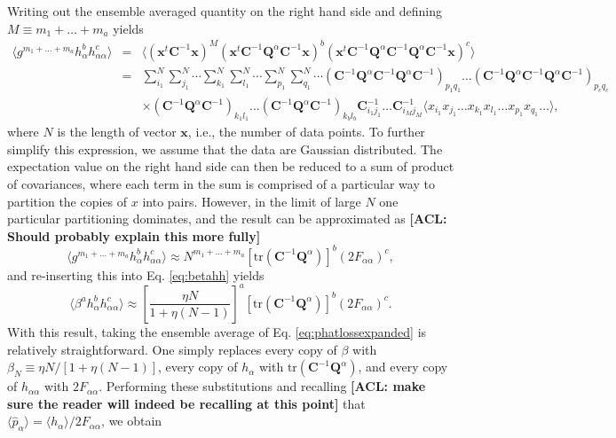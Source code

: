 \documentclass[preprint2,numberedappendix,tighten]{aastex6}  %
\newcommand{\x}{\mathbf{x}}
\newcommand{\C}{\mathbf{C}}
\newcommand{\Q}{\mathbf{Q}}
\newcommand{\acl}[1]{{\color{red} \textbf{[ACL:  #1]}}}
\begin{document}
Writing out the ensemble averaged quantity on the right hand side and defining $M \equiv m_1 + \dots + m_a$ yields
\begin{eqnarray}
\langle g^{m_1 + \dots + m_a} h_\alpha^b h_{\alpha \alpha}^c \rangle &=& \langle (\x^t \C^{-1} \x)^M (\x^t \C^{-1} \Q^\alpha \C^{-1} \x)^b (\x^t \C^{-1} \Q^\alpha \C^{-1} \Q^\alpha \C^{-1}\x )^c \rangle \nonumber \\
&=& \sum_{i_1}^N \sum_{j_1}^N \cdots  \sum_{k_1}^N \sum_{l_1}^N \cdots  \sum_{p_1}^N \sum_{q_1}^N \cdots  ( \C^{-1} \Q^\alpha \C^{-1} \Q^\alpha \C^{-1} )_{p_1 q_1} \dots (\C^{-1} \Q^\alpha \C^{-1} \Q^\alpha \C^{-1})_{p_c q_c}  \nonumber \\
&&  \times ( \C^{-1} \Q^\alpha \C^{-1})_{k_1 l_1} \dots ( \C^{-1} \Q^\alpha \C^{-1})_{k_b l_b} \C^{-1}_{i_1 j_1}\dots \C^{-1}_{i_M j_M} \langle x_{i_1} x_{j_1} \dots   x_{k_1} x_{l_1} \dots  x_{p_1} x_{q_1} \dots \rangle, \quad
\end{eqnarray}
where $N$ is the length of vector $\x$, i.e., the number of data points. To further simplify this expression, we assume that the data are Gaussian distributed. The expectation value on the right hand side can then be reduced to a sum of product of covariances, where each term in the sum is comprised of a particular way to partition the copies of $x$ into pairs. However, in the limit of large $N$ one particular partitioning dominates, and the result can be approximated as \acl{Should probably explain this more fully}
\begin{equation}
\langle g^{m_1 + \dots + m_a} h_\alpha^b h_{\alpha \alpha}^c \rangle \approx N^{m_1 + \dots + m_a} \left[ \textrm{tr} (\C^{-1} \Q^\alpha )\right]^b (2 F_{\alpha \alpha})^c,
\end{equation}
and re-inserting this into Eq. \eqref{eq:betahh} yields
\begin{equation}
\langle \beta^a h_\alpha^b h_{\alpha \alpha}^c \rangle \approx \left[ \frac{\eta N}{1+\eta (N-1)} \right]^a \left[ \textrm{tr} (\C^{-1} \Q^\alpha )\right]^b (2 F_{\alpha \alpha})^c.
\end{equation}
With this result, taking the ensemble average of Eq. \eqref{eq:phatlossexpanded} is relatively straightforward. One simply replaces every copy of $\beta$ with $\beta_N \equiv \eta N / [1 + \eta (N-1)]$, every copy of $h_\alpha$ with $ \textrm{tr} (\C^{-1} \Q^\alpha )$, and every copy of $h_{\alpha \alpha}$ with $2F_{\alpha \alpha}$. Performing these substitutions and recalling \acl{make sure the reader will indeed be recalling at this point} that $\langle \hat{p}_\alpha \rangle = \langle h_\alpha \rangle / 2 F_{\alpha \alpha}$, we obtain
\end{document}
